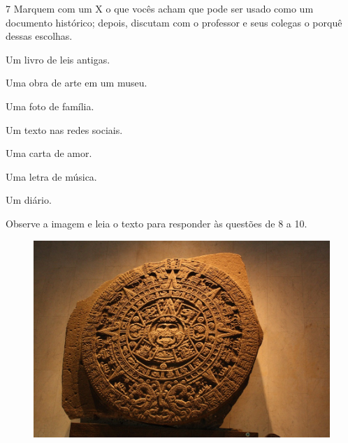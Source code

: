 \pagebreak
\num{7} Marquem com um X o que vocês acham que pode ser usado como um documento
histórico; depois, discutam com o professor e seus colegas o porquê
dessas escolhas.

\begin{boxlist}
\item
  Um livro de leis antigas.
\item
  Uma obra de arte em um museu.
\item
  Uma foto de família.
\item
  Um texto nas redes sociais.
\item
  Uma carta de amor.
\item
  Uma letra de música.
\item
  Um diário.
\end{boxlist}


Observe a imagem e leia o texto para responder às questões de 8 a 10.

\begin{figure}[htpb!]
\includegraphics[width=\textwidth]{./imgs/img32.png}
\end{figure}

